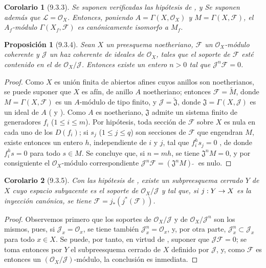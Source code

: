 \documentclass[oneside]{amsart}
\theoremstyle{ega-env-style}
\theoremstyle{ega-thm-env-style}
\newtheorem*{proposition}{Proposición}
\newtheorem*{corollary}{Corolario}
\theoremstyle{ega-defn-env-style}
\def\leq{\leqslant}                 %
\def\supertilde{{\,\widetilde{\,}\,}}   %
\renewcommand{\to}{\mathchoice{\longrightarrow}{\rightarrow}{\rightarrow}{\rightarrow}}
\let\EGAOriginalLabel\label
\renewcommand{\label}[1]{\phantomsection\EGAOriginalLabel{#1}}
\begin{document}
\begin{corollary}[9.3.3]
\label{I.9.3.3}
Se suponen verificadas las hipótesis de , y Se suponen además que
$\mathscr{L}=\mathscr{O}_X$. Entonces, poniendo $A=\Gamma(X,\mathscr{O}_X)$ y $M=\Gamma(X,\mathscr{F})$, el $A_f$-módulo
$\Gamma(X_f,\mathscr{F})$ es canónicamente isomorfo a $M_f$.
\end{corollary}

\begin{proposition}[9.3.4]
\label{I.9.3.4}
Sean $X$ un preesquema noetheriano, $\mathscr{F}$ un $\mathscr{O}_X$-módulo coherente y $\mathscr{J}$ un
haz coherente de ideales de $\mathscr{O}_X$, tales que el soporte de $\mathscr{F}$ esté contenido en el
de $\mathscr{O}_X/\mathscr{J}$. Entonces existe un entero $n>0$ tal que $\mathscr{J}^n\mathscr{F}=0$.
\end{proposition}

\begin{proof}
Como $X$ es unión finita de abiertos afines cuyos anillos son noetherianos, se puede suponer
que $X$ es afín, de anillo $A$ noetheriano; entonces $\mathscr{F}=\widetilde M$, donde
$M=\Gamma(X,\mathscr{F})$ es un $A$-módulo de tipo finito, y $\mathscr{J}=\widetilde{\mathfrak{J}}$,
donde $\mathfrak{J}=\Gamma(X,\mathscr{J})$ es un ideal de $A$ ( y
). Como $A$ es noetheriano, $\mathfrak{J}$ admite un sistema finito de
generadores $f_i$ ($1\leq i\leq m$). Por hipótesis, toda sección de $\mathscr{F}$ sobre
$X$ es nula en cada uno de los $D(f_i)$; si $s_j$ ($1\leq j\leq q$) son secciones de
$\mathscr{F}$ que engendran $M$, existe entonces un entero $h$, independiente de $i$ y $j$,
tal que $f_i^h s_j=0$ , de donde $f_i^h s=0$ para todo $s\in M$. Se concluye
que, si $n=mh$, se tiene $\mathfrak{J}^nM=0$, y por consiguiente el $\mathscr{O}_X$-módulo correspondiente
$\mathscr{J}^n\mathscr{F}=(\mathfrak{J}^nM)\supertilde$  es nulo.
\end{proof}

\begin{corollary}[9.3.5]
\label{I.9.3.5}
Con las hipótesis de , existe un subpreesquema cerrado $Y$ de $X$ cuyo
espacio subyacente es el soporte de $\mathscr{O}_X/\mathscr{J}$ y tal que, si $j:Y\to X$ es la
inyección canónica, se tiene $\mathscr{F}=j_*(j^*(\mathscr{F}))$.
\end{corollary}

\begin{proof}
Observemos primero que los soportes de $\mathscr{O}_X/\mathscr{J}$ y de $\mathscr{O}_X/\mathscr{J}^n$ son
los mismos, pues, si $\mathscr{J}_x=\mathscr{O}_x$, se tiene también $\mathscr{J}_x^n=\mathscr{O}_x$, y,
por otra parte, $\mathscr{J}_x^n\subset\mathscr{J}_x$ para todo $x\in X$. Se puede, por tanto, en
virtud de , suponer que $\mathscr{J}\mathscr{F}=0$; se toma entonces por $Y$ el
subpreesquema cerrado de $X$ definido por $\mathscr{J}$, y, como $\mathscr{F}$ es entonces un
$(\mathscr{O}_X/\mathscr{J})$-módulo, la conclusión es inmediata.
\end{proof}
\end{document}
